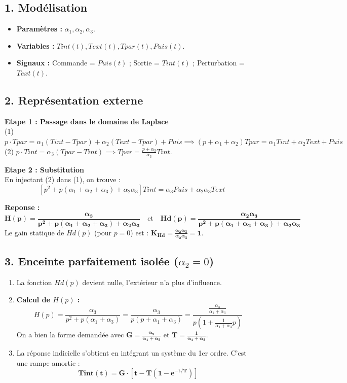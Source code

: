 \documentclass[11pt,a4paper]{article}
\begin{document}
\subsection*{1. Modélisation}

\begin{itemize}
    \item \textbf{Paramètres :} $\alpha_1, \alpha_2, \alpha_3$.
    \item \textbf{Variables :} $Tint(t), Text(t), Tpar(t), Puis(t)$.
    \item \textbf{Signaux :} Commande = $Puis(t)$ ; Sortie = $Tint(t)$ ; Perturbation = $Text(t)$.
\end{itemize}

\subsection*{2. Représentation externe}

\textbf{Etape 1 : Passage dans le domaine de Laplace}\\
(1) $p \cdot Tpar = \alpha_1(Tint - Tpar) + \alpha_2(Text - Tpar) + Puis \implies (p + \alpha_1 + \alpha_2)Tpar = \alpha_1 Tint + \alpha_2 Text + Puis$\\
(2) $p \cdot Tint = \alpha_3(Tpar - Tint) \implies Tpar = \frac{p+\alpha_3}{\alpha_3} Tint$.

\textbf{Etape 2 : Substitution}\\
En injectant (2) dans (1), on trouve :
$$
[p^2 + p(\alpha_1 + \alpha_2 + \alpha_3) + \alpha_2 \alpha_3] Tint = \alpha_3 Puis + \alpha_2 \alpha_3 Text
$$

\textbf{Reponse :}
$$
\mathbf{H(p) = \frac{\alpha_3}{p^2 + p(\alpha_1+\alpha_2+\alpha_3) + \alpha_2 \alpha_3}} \quad \text{et} \quad \mathbf{Hd(p) = \frac{\alpha_2 \alpha_3}{p^2 + p(\alpha_1+\alpha_2+\alpha_3) + \alpha_2 \alpha_3}}
$$
Le gain statique de $Hd(p)$ (pour $p=0$) est : $\mathbf{K_{Hd} = \frac{\alpha_2 \alpha_3}{\alpha_2 \alpha_3} = 1}$.

\subsection*{3. Enceinte parfaitement isolée ($\alpha_2 = 0$)}

\begin{enumerate}
    \item[(a)] La fonction $Hd(p)$ devient nulle, l'extérieur n'a plus d'influence.
    \item[(b)] \textbf{Calcul de $H(p)$ :}
    $$
    H(p) = \frac{\alpha_3}{p^2 + p(\alpha_1+\alpha_3)} = \frac{\alpha_3}{p(p + \alpha_1 + \alpha_3)} = \frac{\frac{\alpha_3}{\alpha_1+\alpha_3}}{p(1 + \frac{1}{\alpha_1+\alpha_3} p)}
    $$
    On a bien la forme demandée avec $\mathbf{G = \frac{\alpha_3}{\alpha_1+\alpha_3}}$ et $\mathbf{T = \frac{1}{\alpha_1+\alpha_3}}$.
    \item[(c)] La réponse indicielle s'obtient en intégrant un système du 1er ordre. C'est une rampe amortie :
    $$
    \mathbf{Tint(t) = G \cdot [t - T(1 - e^{-t/T})]}
    $$
\end{enumerate}
\end{document}
